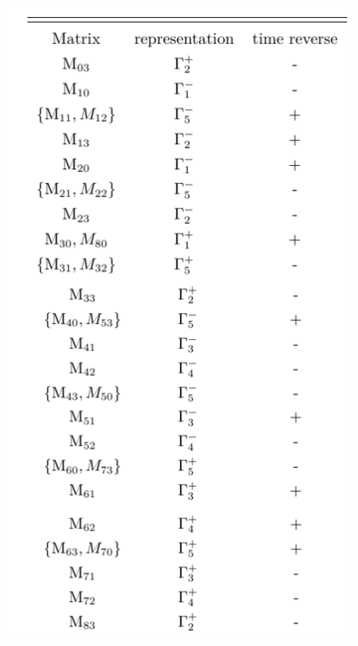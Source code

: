 \documentclass[5pt]{article}
\begin{document}
\begin{figure}[H]
	\centering
	\includegraphics[scale=0.8]{figure/2}
	\caption{}
	\label{}
\end{figure}
\end{document}
